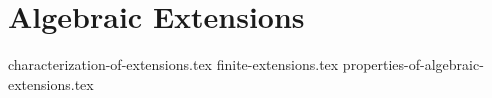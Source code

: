 \chapter{Algebraic Extensions}
{characterization-of-extensions.tex}
{finite-extensions.tex}
{properties-of-algebraic-extensions.tex}
